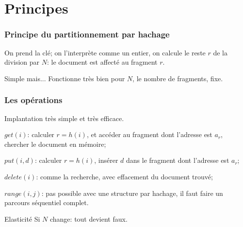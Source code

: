 \section{Principes}

\begin{frame}
\frametitle{Principe du partitionnement par hachage}

On prend la clé; on l'interprète comme un entier, on calcule le
reste $r$ de la division par $N$: le document est affecté au fragment $r$.

\vfill


\vfill

\begin{remblock}{}Simple mais...
Fonctionne très bien pour $N$, le nombre de fragments, \alert{fixe}.
\end{remblock}
\end{frame}



\begin{frame}
\frametitle{Les opérations}

Implantation très simple et très efficace.

\begin{redbullet}
  \item $get(i)$: calculer $r = h(i)$, et accéder au  
    fragment dont l'adresse est $a_r$, chercher le document en mémoire;
  \item $put(i, d)$: calculer $r = h(i)$, 
    insérer $d$ dans le fragment dont l'adresse est  $a_r$;
  \item $delete(i)$: comme la recherche, avec effacement du document trouvé;
  \item $range(i, j)$: \alert{pas possible avec une structure par hachage}, il 
    faut faire un parcours séquentiel complet.
\end{redbullet}     

\vfill

\begin{remblock}{Elasticité}
Si $N$ change: tout devient faux. 
\end{remblock}
\end{frame}


